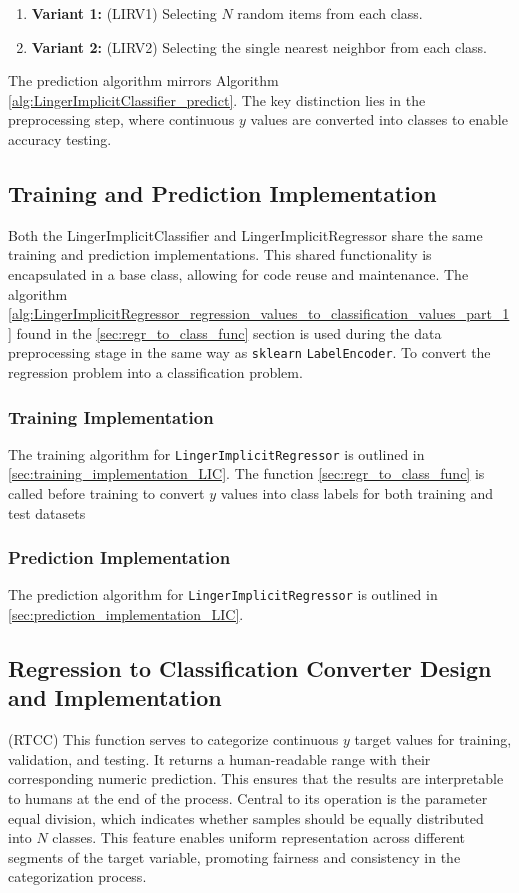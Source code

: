 \documentclass[a4paper, 12pt]{report}
\begin{document}
\begin{enumerate}
\item \textbf{Variant 1:} (LIRV1) Selecting $N$ random items from each class.
\item \textbf{Variant 2:} (LIRV2) Selecting the single nearest neighbor from each class.
\end{enumerate}

The prediction algorithm mirrors Algorithm \ref{alg:LingerImplicitClassifier_predict}. 
The key distinction lies in the preprocessing step, where continuous $y$ values are 
converted into classes to enable accuracy testing.

\subsection{Training and Prediction Implementation}
Both the LingerImplicitClassifier and LingerImplicitRegressor share the same training and prediction implementations. 
This shared functionality is encapsulated in a base class, allowing for code reuse and maintenance. The algorithm \ref{alg:LingerImplicitRegressor_regression_values_to_classification_values_part_1} found in the 
\ref{sec:regr_to_class_func} section is used during the data preprocessing stage in the same way as \texttt{sklearn} \texttt{LabelEncoder}. 
To convert the regression problem into a classification problem.

\subsubsection{Training Implementation}
The training algorithm for \texttt{LingerImplicitRegressor} is outlined in \ref{sec:training_implementation_LIC}.
The function \ref{sec:regr_to_class_func} is called before training to convert $y$ values into class labels for both training and test datasets

\subsubsection{Prediction Implementation}
The prediction algorithm for \texttt{LingerImplicitRegressor} is outlined in \ref{sec:prediction_implementation_LIC}.

\subsection{Regression to Classification Converter Design and Implementation} (RTCC)
\label{sec:regr_to_class_func}
This function serves to categorize continuous $y$ target values for training, validation, and testing. 
It returns a human-readable range with their corresponding numeric prediction.
This ensures that the results are interpretable to humans at the end of the process.
Central to its operation is the parameter $\text{equal division}$, which indicates whether samples should be equally distributed into $N$ 
classes. This feature enables uniform representation across different segments of the target variable, promoting fairness and consistency 
in the categorization process.
\end{document}
